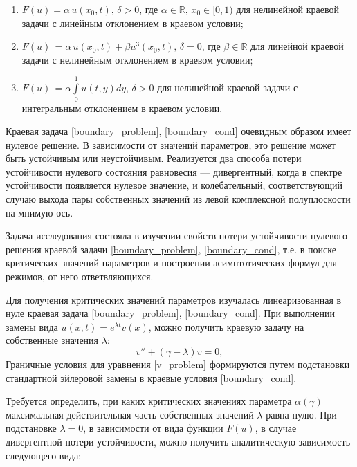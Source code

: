 \documentclass[12pt]{extarticle}
\begin{document}
\begin{enumerate}[label=\arabic*),leftmargin=1.5\parindent]

\item $ F(u) = \alpha\,u(x_0, t), \, \delta>0 $, где $ \alpha \in \mathbb{R}, \, x_0 \in [0, 1) $ для нелинейной краевой задачи с линейным отклонением в краевом условии;
\item $ F(u) \, = \alpha\,u(x_0, t) + \beta u^3(x_0, t), \, \delta=0 $, где $ \beta \in \mathbb{R} $ для линейной краевой задачи с нелинейным отклонением в краевом условии;
\item $ F(u) \, = \alpha\int\limits_{0}^{1} u(t, y) dy, \,  \delta > 0$ для нелинейной краевой задачи с интегральным отклонением в краевом условии.

\end{enumerate}

Краевая задача \eqref{boundary_problem}, \eqref{boundary_cond} очевидным образом имеет нулевое решение. В зависимости от значений параметров, это решение может быть устойчивым или неустойчивым. Реализуется два способа потери устойчивости нулевого состояния равновесия --- дивергентный, когда в спектре устойчивости появляется нулевое значение, и колебательный, соответствующий случаю выхода пары собственных значений из левой комплексной полуплоскости на мнимую ось.

Задача исследования состояла в изучении свойств потери устойчивости нулевого решения краевой задачи \eqref{boundary_problem}, \eqref{boundary_cond}, т.е. в поиске критических значений параметров и построении асимптотических формул для режимов, от него ответвляющихся.

Для получения критических значений параметров изучалась линеаризованная в нуле краевая задача \eqref{boundary_problem}, \eqref{boundary_cond}. При выполнении замены вида $ u(x, t) = e^{\lambda t}v(x) $, можно получить краевую задачу на собственные значения $ \lambda $:
\begin{equation}\label{v_problem}
	v'' + (\gamma - \lambda)v = 0,	
\end{equation} 
Граничные условия для уравнения \eqref{v_problem} формируются путем подстановки стандартной эйлеровой замены в краевые условия \eqref{boundary_cond}.

Требуется определить, при каких критических значениях параметра $\alpha(\gamma)$  максимальная действительная часть собственных значений $ \lambda $ равна нулю. При подстановке $ \lambda = 0 $, в зависимости от вида функции $ F(u) $, в случае дивергентной потери устойчивости, можно получить аналитическую зависимость следующего вида:
\end{document}
